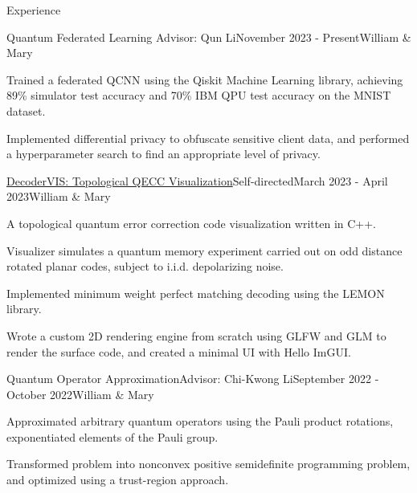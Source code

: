 \documentclass{resume} %
\begin{document}
\begin{rSection}{Experience}

    \begin{rSubsection}{Quantum Federated Learning} {Advisor: Qun Li}{November 2023 - Present}{William \& Mary}
        \startitems
        \item Trained a federated QCNN using the Qiskit Machine Learning library, achieving 89\% simulator test accuracy and 70\% IBM QPU test accuracy on the MNIST dataset.
        \item Implemented differential privacy to obfuscate sensitive client data, and performed a hyperparameter search to find an appropriate level of privacy.  
    \end{rSubsection}

    \begin{rSubsection}{\href{https://github.com/ypwk/DecoderVIS/tree/main}{DecoderVIS: Topological QECC Visualization}}{Self-directed}{March 2023 - April 2023}{{William \& Mary}}
        \startitems
        \item A topological quantum error correction code visualization written in C++. 
        \item Visualizer simulates a quantum memory experiment carried out on odd distance rotated planar codes, subject to i.i.d. depolarizing noise.
        \item Implemented minimum weight perfect matching decoding using the LEMON library. 
        \item Wrote a custom 2D rendering engine from scratch using GLFW and GLM to render the surface code, and created a minimal UI with Hello ImGUI.
    \end{rSubsection}

    \begin{rSubsection}{Quantum Operator Approximation}{Advisor: Chi-Kwong Li}{September 2022 - October 2022}{{William \& Mary}}
        \startitems
        \item Approximated arbitrary quantum operators using the Pauli product rotations, exponentiated elements of the Pauli group. 
        \item Transformed problem into nonconvex positive semidefinite programming problem, and optimized using a trust-region approach.
    \end{rSubsection}


\end{rSection}
\end{document}
